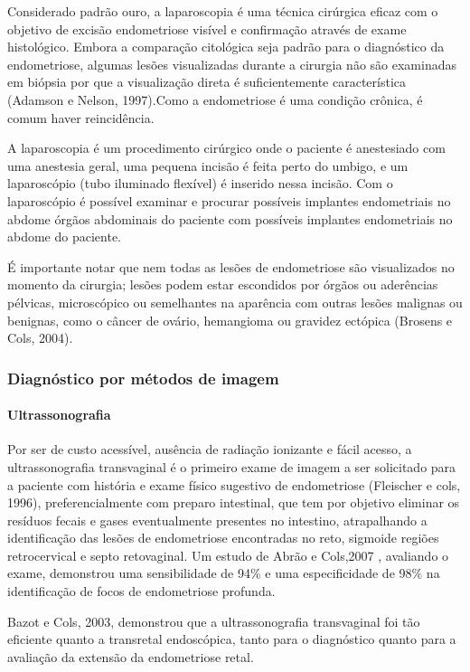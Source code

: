 \documentclass[12pt]{article} %
\begin{document}
Considerado padrão ouro, a laparoscopia é uma técnica cirúrgica eficaz com o objetivo de excisão endometriose visível e confirmação através de exame histológico. Embora a comparação citológica seja padrão para o diagnóstico da endometriose, algumas lesões visualizadas durante a cirurgia não são examinadas em biópsia por que a visualização direta é suficientemente característica (Adamson e Nelson, 1997).Como a endometriose é uma condição crônica, é comum haver reincidência.



A laparoscopia é um procedimento cirúrgico onde o paciente é anestesiado com uma anestesia geral, uma pequena incisão é feita perto do umbigo, e um laparoscópio (tubo iluminado flexível) é inserido nessa incisão. Com o laparoscópio é possível examinar e procurar possíveis implantes endometriais no abdome órgãos abdominais do paciente com possíveis implantes endometriais no abdome  do paciente.  


É importante notar que nem todas as lesões de endometriose são visualizados no momento da cirurgia; lesões podem estar escondidos por órgãos ou aderências pélvicas, microscópico ou semelhantes na aparência com outras lesões malignas ou benignas, como o câncer de ovário, hemangioma ou gravidez ectópica (Brosens e Cols, 2004). 


\subsubsection{Diagnóstico por métodos de imagem}

\paragraph{Ultrassonografia } 

Por ser de custo acessível, ausência de radiação ionizante e fácil acesso, a ultrassonografia transvaginal é o primeiro exame de imagem a ser solicitado para a paciente com história e exame físico sugestivo de endometriose (Fleischer e cols, 1996), preferencialmente com preparo intestinal, que tem por objetivo eliminar os resíduos fecais e gases eventualmente presentes no intestino, atrapalhando a identificação das lesões de endometriose encontradas no reto, sigmoide regiões retrocervical e septo retovaginal. Um estudo de Abrão e Cols,2007 , avaliando o exame, demonstrou uma sensibilidade de 94\% e uma especificidade de 98\% na identificação de focos de endometriose profunda.

Bazot e Cols, 2003, demonstrou que a ultrassonografia transvaginal foi tão eficiente quanto a transretal endoscópica, tanto para o diagnóstico quanto para a avaliação da extensão da endometriose retal.
\end{document}
